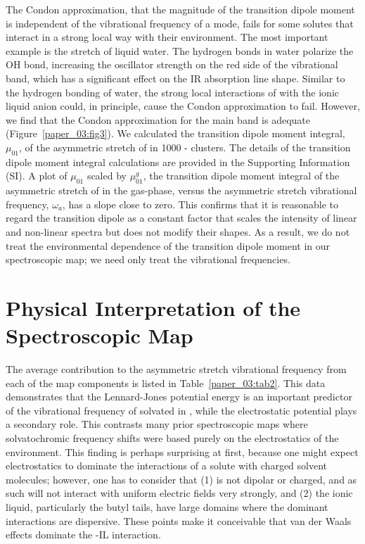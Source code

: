 The Condon approximation, that the magnitude of the transition dipole moment is independent of the vibrational frequency of a mode, fails for some solutes that interact in a strong local way with their environment. The most important example is the  stretch of liquid water. The hydrogen bonds in water polarize the OH bond, increasing the oscillator strength on the red side of the vibrational band, which has a significant effect on the IR absorption line shape.\cite{63,64,87} Similar to the hydrogen bonding of water, the strong local interactions of  with the ionic liquid anion could, in principle, cause the Condon approximation to fail. However, we find that the Condon approximation for the main band is adequate (Figure~\ref{paper_03:fig3}). We calculated the transition dipole moment integral, \(\mu_{01}\), of the asymmetric stretch of  in \num{1000} -\ce{[C4C1im][PF6]} clusters. The details of the transition dipole moment integral calculations are provided in the Supporting Information (SI). A plot of \(\mu_{01}\) scaled by \(\mu_{01}^{g}\), the transition dipole moment integral of the asymmetric stretch of  in the gas-phase, versus the asymmetric stretch vibrational frequency, \(\omega_{a}\), has a slope close to zero. This confirms that it is reasonable to regard the transition dipole as a constant factor that scales the intensity of linear and non-linear spectra but does not modify their shapes. As a result, we do not treat the environmental dependence of the transition dipole moment in our spectroscopic map; we need only treat the vibrational frequencies.

\section{Physical Interpretation of the Spectroscopic Map}
\label{paper_03:sec:IV}

The average contribution to the  asymmetric stretch vibrational frequency from each of the map components is listed in Table~\ref{paper_03:tab2}. This data demonstrates that the Lennard-Jones potential energy is an important predictor of the vibrational frequency of  solvated in \ce{[C4C1im][PF6]}, while the electrostatic potential plays a secondary role. This contrasts many prior spectroscopic maps where solvatochromic frequency shifts were based purely on the electrostatics of the environment.\cite{lin_water_2009-1,62,88} This finding is perhaps surprising at first, because one might expect electrostatics to dominate the interactions of a solute with charged solvent molecules; however, one has to consider that (1)  is not dipolar or charged, and as such will not interact with uniform electric fields very strongly, and (2) the ionic liquid, particularly the \ce{[C4C1im]+} butyl tails, have large domains where the dominant interactions are dispersive. These points make it conceivable that van der Waals effects dominate the -IL interaction.

